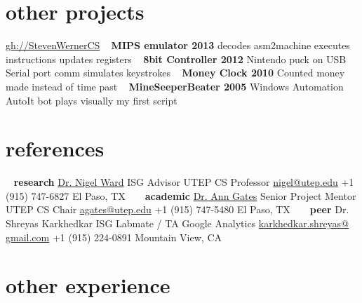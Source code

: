 \documentclass[]{friggeri-cv} %
\begin{document}
\newpage
\clearpage
\begin{aside2}
\section{other projects}
\href{http://www.github.com/StevenWernerCS/}{gh://StevenWernerCS}
~
\textbf{MIPS emulator 2013}
decodes asm2machine
executes instructions
updates registers
~
\textbf{8bit Controller 2012}
Nintendo puck on USB
Serial port comm
simulates keystrokes
~
\textbf{Money Clock 2010}
Counted money made
instead of time past
~
\textbf{MineSeeperBeater 2005}
Windows Automation
AutoIt bot plays visually
my first script
~
~
\section{references}
~
\textbf{research}
\href{http://www.cs.utep.edu/nigel/}{Dr. Nigel Ward}
ISG Advisor
UTEP CS Professor
\href{mailto:nigel@utep.edu}{nigel@utep.edu}
+1 (915) 747-6827
El Paso, TX
~
~
\textbf{academic}
\href{http://www.cs.utep.edu/agates/}{Dr. Ann Gates}
Senior Project Mentor
UTEP CS Chair
\href{mailto:agates@utep.edu}{agates@utep.edu}
+1 (915) 747-5480
El Paso, TX
~
~
\textbf{peer}
Dr. Shreyas Karkhedkar
ISG Labmate / TA
Google Analytics
\href{mailto:karkhedkar.shreyas@gmail.com}{karkhedkar.shreyas@
gmail.com}
+1 (915) 224-0891
Mountain View, CA
\end{aside2}



\section{other experience}
\end{document}

